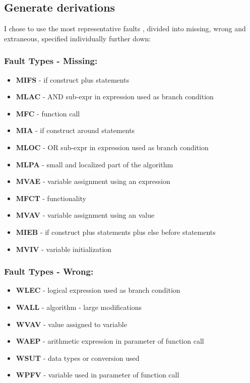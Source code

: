 \subsection{Generate derivations}

I chose to use the most representative faults \cite{duraes2006emulation}, divided into missing, wrong and extraneous, specified individually further down:

\subsubsection{Fault Types - Missing:}
\begin{itemize}
	\item \textbf{MIFS} - if construct plus statements
	\item \textbf{MLAC} - AND sub-expr in expression used as branch condition
	\item \textbf{MFC}  - function call
	\item \textbf{MIA}  - if construct around statements
	\item \textbf{MLOC} - OR sub-expr in expression used as branch condition
	\item \textbf{MLPA} - small and localized part of the algorithm
	\item \textbf{MVAE} - variable assignment using an expression
	\item \textbf{MFCT} - functionality
	\item \textbf{MVAV} - variable assignment using an value
	\item \textbf{MIEB} - if construct plus statements plus else before statements
	\item \textbf{MVIV} - variable initialization
\end{itemize}

\subsubsection{Fault Types - Wrong:}
\begin{itemize}
	\item \textbf{WLEC} - logical expression used as branch condition
	\item \textbf{WALL} - algorithm - large modifications
	\item \textbf{WVAV} - value assigned to variable
	\item \textbf{WAEP} - arithmetic expression in parameter of function call
	\item \textbf{WSUT} - data types or conversion used 
	\item \textbf{WPFV} - variable used in parameter of function call 
\end{itemize}

